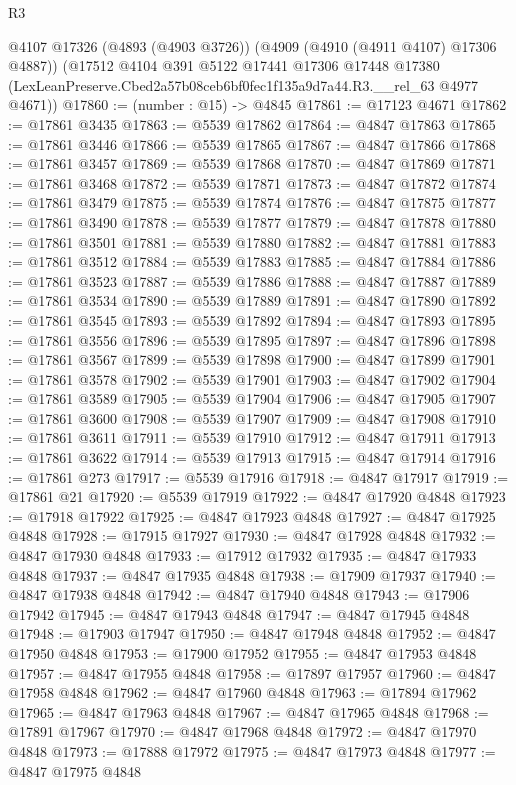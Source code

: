 \begin{lexlean}{R3}
\begin{coremodule}
    @4107
    @17326
    (@4893 (@4903 @3726))
    (@4909 (@4910 (@4911 @4107) @17306 @4887))
    (@17512
      @4104
      @391
      @5122
      @17441
      @17306
      @17448
      @17380
      (LexLeanPreserve.Cbed2a57b08ceb6bf0fec1f135a9d7a44.R3.__rel_63 @4977 @4671))
@17860 := (number : @15) -> @4845
@17861 := @17123 @4671
@17862 := @17861 @3435
@17863 := @5539 @17862
@17864 := @4847 @17863
@17865 := @17861 @3446
@17866 := @5539 @17865
@17867 := @4847 @17866
@17868 := @17861 @3457
@17869 := @5539 @17868
@17870 := @4847 @17869
@17871 := @17861 @3468
@17872 := @5539 @17871
@17873 := @4847 @17872
@17874 := @17861 @3479
@17875 := @5539 @17874
@17876 := @4847 @17875
@17877 := @17861 @3490
@17878 := @5539 @17877
@17879 := @4847 @17878
@17880 := @17861 @3501
@17881 := @5539 @17880
@17882 := @4847 @17881
@17883 := @17861 @3512
@17884 := @5539 @17883
@17885 := @4847 @17884
@17886 := @17861 @3523
@17887 := @5539 @17886
@17888 := @4847 @17887
@17889 := @17861 @3534
@17890 := @5539 @17889
@17891 := @4847 @17890
@17892 := @17861 @3545
@17893 := @5539 @17892
@17894 := @4847 @17893
@17895 := @17861 @3556
@17896 := @5539 @17895
@17897 := @4847 @17896
@17898 := @17861 @3567
@17899 := @5539 @17898
@17900 := @4847 @17899
@17901 := @17861 @3578
@17902 := @5539 @17901
@17903 := @4847 @17902
@17904 := @17861 @3589
@17905 := @5539 @17904
@17906 := @4847 @17905
@17907 := @17861 @3600
@17908 := @5539 @17907
@17909 := @4847 @17908
@17910 := @17861 @3611
@17911 := @5539 @17910
@17912 := @4847 @17911
@17913 := @17861 @3622
@17914 := @5539 @17913
@17915 := @4847 @17914
@17916 := @17861 @273
@17917 := @5539 @17916
@17918 := @4847 @17917
@17919 := @17861 @21
@17920 := @5539 @17919
@17922 := @4847 @17920 @4848
@17923 := @17918 @17922
@17925 := @4847 @17923 @4848
@17927 := @4847 @17925 @4848
@17928 := @17915 @17927
@17930 := @4847 @17928 @4848
@17932 := @4847 @17930 @4848
@17933 := @17912 @17932
@17935 := @4847 @17933 @4848
@17937 := @4847 @17935 @4848
@17938 := @17909 @17937
@17940 := @4847 @17938 @4848
@17942 := @4847 @17940 @4848
@17943 := @17906 @17942
@17945 := @4847 @17943 @4848
@17947 := @4847 @17945 @4848
@17948 := @17903 @17947
@17950 := @4847 @17948 @4848
@17952 := @4847 @17950 @4848
@17953 := @17900 @17952
@17955 := @4847 @17953 @4848
@17957 := @4847 @17955 @4848
@17958 := @17897 @17957
@17960 := @4847 @17958 @4848
@17962 := @4847 @17960 @4848
@17963 := @17894 @17962
@17965 := @4847 @17963 @4848
@17967 := @4847 @17965 @4848
@17968 := @17891 @17967
@17970 := @4847 @17968 @4848
@17972 := @4847 @17970 @4848
@17973 := @17888 @17972
@17975 := @4847 @17973 @4848
@17977 := @4847 @17975 @4848

\end{coremodule}
\end{lexlean}
